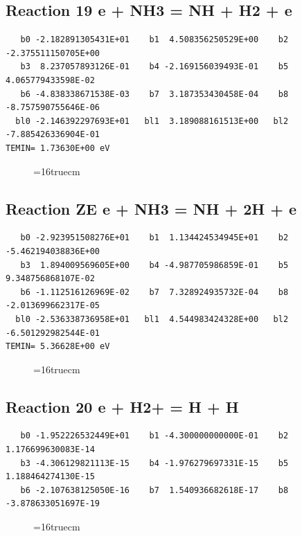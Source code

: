 \documentclass[12pt,dvipdfm]{article}
\begin{document}
\subsection{
Reaction 19 e + NH3 = NH + H2 + e}
\begin{small}\begin{verbatim}
   b0 -2.182891305431E+01    b1  4.508356250529E+00    b2 -2.375511150705E+00
   b3  8.237057893126E-01    b4 -2.169156039493E-01    b5  4.065779433598E-02
   b6 -4.838338671538E-03    b7  3.187353430458E-04    b8 -8.757590755646E-06
  bl0 -2.146392297693E+01   bl1  3.189088161513E+00   bl2 -7.885426336904E-01
TEMIN= 1.73630E+00 eV
   \end{verbatim}\end{small}
\begin{figure}[h!]
\label{n2rates}
\epsfxsize=16truecm
\end{figure}
\newpage

\subsection{
Reaction ZE e + NH3 = NH + 2H + e}
\begin{small}\begin{verbatim}
   b0 -2.923951508276E+01    b1  1.134424534945E+01    b2 -5.462194038836E+00
   b3  1.894009569605E+00    b4 -4.987705986859E-01    b5  9.348756868107E-02
   b6 -1.112516126969E-02    b7  7.328924935732E-04    b8 -2.013699662317E-05
  bl0 -2.536338736958E+01   bl1  4.544983424328E+00   bl2 -6.501292982544E-01
TEMIN= 5.36628E+00 eV
   \end{verbatim}\end{small}
\begin{figure}[h!]
\label{n2rates}
\epsfxsize=16truecm
\end{figure}
\newpage

\subsection{
Reaction 20 e + H2+ = H + H}
\begin{small}\begin{verbatim}
   b0 -1.952226532449E+01    b1 -4.300000000000E-01    b2  1.176699630083E-14
   b3 -4.306129821113E-15    b4 -1.976279697331E-15    b5  1.188464274130E-15
   b6 -2.107638125050E-16    b7  1.540936682618E-17    b8 -3.878633051697E-19
   \end{verbatim}\end{small}
\begin{figure}[h!]
\label{n2rates}
\epsfxsize=16truecm
\end{figure}
\newpage
\end{document}
